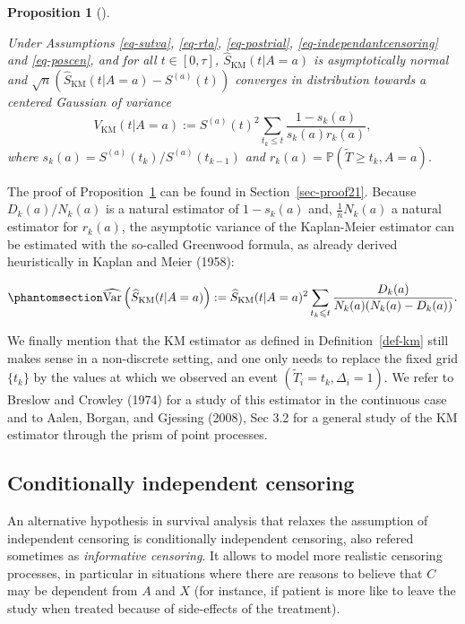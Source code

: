 \documentclass[
  11pt,
  a4paper,
]{article}
\theoremstyle{plain}
\theoremstyle{plain}
\theoremstyle{plain}
\newtheorem{proposition}{Proposition}[section]
\theoremstyle{definition}
\theoremstyle{remark}
\begin{document}
\begin{proposition}[]\protect\hypertarget{prp-varkm}{}\label{prp-varkm}

Under Assumptions
\ref{eq-sutva}, \ref{eq-rta}, \ref{eq-postrial}, \ref{eq-independantcensoring}
and \ref{eq-poscen}, and for all \(t \in [0,\tau]\),
\(\widehat S_{\mathrm{KM}}(t|A=a)\) is asymptotically normal and
\(\sqrt{n}\left(\widehat S_{\mathrm{KM}}(t|A=a) - S^{(a)}(t)\right)\)
converges in distribution towards a centered Gaussian of variance \[
V_{\mathrm{KM}}(t|A=a) := S^{(a)}(t)^2 \sum_{t_k \leqslant t} \frac{1-s_k(a)}{s_k(a) r_k(a)},
\] where \(s_k(a) = S^{(a)}(t_k)/S^{(a)}(t_{k-1})\) and
\(r_k(a) = \mathbb{P}(\widetilde T \geqslant t_k, A=a)\).

\end{proposition}

The proof of Proposition~\ref{prp-varkm} can be found in
Section~\ref{sec-proof21}. Because \(D_k(a)/N_k(a)\) is a natural
estimator of \(1-s_k(a)\) and, \(\frac{1}{n} N_k(a)\) a natural
estimator for \(r_k(a)\), the asymptotic variance of the Kaplan-Meier
estimator can be estimated with the so-called Greenwood formula, as
already derived heuristically in Kaplan and Meier (1958):

\begin{equation}\phantomsection\label{eq-varkm}{
\widehat{\mathrm{Var}} \left(\widehat{S}_{\mathrm{KM}}(t|A=a)\right) := \widehat{S}_{\mathrm{KM}}(t|A=a)^2 \sum_{t_k \leqslant t} \frac{D_k(a)}{N_k(a)(N_k(a)-D_k(a))}.
}\end{equation}

We finally mention that the KM estimator as defined in
Definition~\ref{def-km} still makes sense in a non-discrete setting, and
one only needs to replace the fixed grid \(\{t_k\}\) by the values at
which we observed an event \((\widetilde T_i = t_k, \Delta_i =1)\). We
refer to Breslow and Crowley (1974) for a study of this estimator in the
continuous case and to Aalen, Borgan, and Gjessing (2008), Sec 3.2 for a
general study of the KM estimator through the prism of point processes.

\subsection{Conditionally independent censoring}\label{sec-condcens}

An alternative hypothesis in survival analysis that relaxes the
assumption of independent censoring is conditionally independent
censoring, also refered sometimes as \emph{informative censoring}. It
allows to model more realistic censoring processes, in particular in
situations where there are reasons to believe that \(C\) may be
dependent from \(A\) and \(X\) (for instance, if patient is more like to
leave the study when treated because of side-effects of the treatment).
\end{document}
